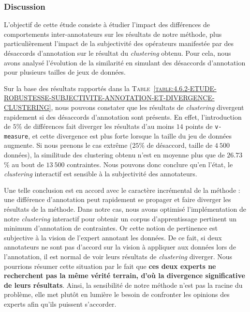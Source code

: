 		\subsubsection{Discussion}
		
			L'objectif de cette étude consiste à étudier l'impact des différences de comportements inter-annotateurs sur les résultats de notre méthode, plus particulièrement l'impact de la subjectivité des opérateurs manifestée par des désaccords d'annotation sur le résultat du \textit{clustering} obtenu.
			Pour cela, nous avons analysé l'évolution de la similarité en simulant des désaccords d'annotation pour plusieurs tailles de jeux de données.
			
		
			Sur la base des résultats rapportés dans la \textsc{Table~\ref{table:4.6.2-ETUDE-ROBUSTESSE-SUBJECTIVITE-ANNOTATION-ET-DIVERGENCE-CLUSTERING}}, nous pouvons constater que les résultats de \textit{clustering} divergent rapidement si des désaccords d'annotation sont présents.
			En effet, l'introduction de $5$\% de différences fait diverger les résultats d'au moins $14$ points de \texttt{v-measure}, et cette divergence est plus forte lorsque la taille du jeu de données augmente.
			Si nous prenons le cas extrême ($25$\% de désaccord, taille de $4~500$ données), la similitude des clustering obtenu n'est en moyenne plus que de $26.73$\% au bout de $13~500$ contraintes.
			Nous pouvons donc conclure qu'en l'état, le \textit{clustering} interactif est sensible à la subjectivité des annotateurs.
			
			Une telle conclusion est en accord avec le caractère incrémental de la méthode : une différence d'annotation peut rapidement se propager et faire diverger les résultats de la méthode.
			Dans notre cas, nous avons optimisé l'implémentation de notre \textit{clustering} interactif pour obtenir un corpus d'apprentissage pertinent un minimum d'annotation de contraintes.
			Or cette notion de pertinence est subjective à la vision de l'expert annotant les données.
			De ce fait, si deux annotateurs ne sont pas d'accord sur la vision à appliquer aux données lors de l'annotation, il est normal de voir leurs résultats de \textit{clustering} diverger.
			Nous pourrions résumer cette situation par le fait que \textbf{ces deux experts ne recherchent pas la même vérité terrain, d'où la divergence significative de leurs résultats}.
			Ainsi, la sensibilité de notre méthode n'est pas la racine du problème, elle met plutôt en lumière le besoin de confronter les opinions des experts afin qu'ils puissent s'accorder.
			
